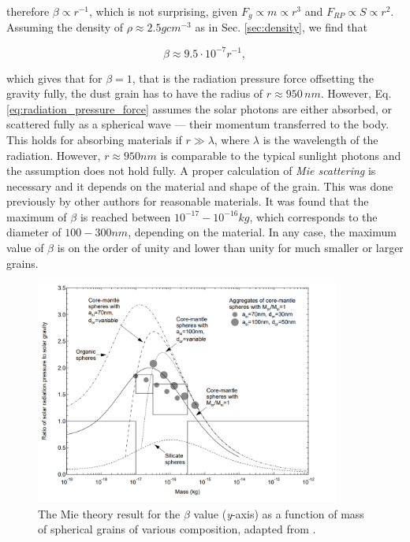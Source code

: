 therefore $\beta \propto r^{-1}$, which is not surprising, given $F_{g} \propto m \propto r^{3}$ and 
$F_{RP} \propto S \propto r^{2}$. Assuming the density of $\rho \approx 2.5 \si{gcm^{-3}}$ as in Sec. \ref{sec:density}, we find that 

\begin{equation}
    \beta \approx 9.5 \cdot 10^{-7} r^{-1},
\end{equation}

which gives that for $\beta = 1$, that is the radiation pressure force offsetting the gravity fully, the dust grain has to have the radius of $r \approx 950 \, \si{nm}$. However, Eq. \eqref{eq:radiation_pressure_force} assumes the solar photons are either absorbed, or scattered fully as a spherical wave --- their momentum transferred to the body. This holds for absorbing materials if $r \gg \lambda$, where $\lambda$ is the wavelength of the radiation. However, $r \approx 950 \si{nm}$ is comparable to the typical sunlight photons and the assumption does not hold fully. A proper calculation of \textit{Mie scattering} is necessary and it depends on the material and shape of the grain. This was done previously by other authors \cite{kimura2003composition} for reasonable materials. It was found that the maximum of $\beta$ is reached between $10^{-17} - 10^{-16} \si{kg}$, which corresponds to the diameter of $100 - 300 \si{nm}$, depending on the material. In any case, the maximum value of $\beta$ is on the order of unity and lower than unity for much smaller or larger grains.

\begin{figure}[h]
 	\centering
 	\includegraphics[width=10cm]{figures/kimurra_mie.png}
 	\caption{The Mie theory result for the $\beta$ value (\textit{y}-axis) as a function of mass of spherical grains of various composition, adapted from \cite{kimura2003composition}.}
 	\label{fig:kimura_mie}
\end{figure}

